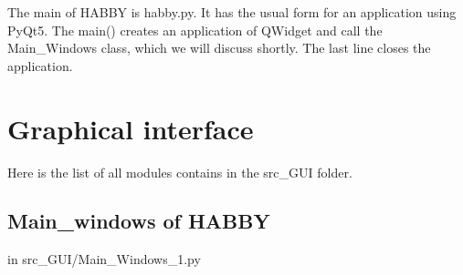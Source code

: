 \documentclass[letterpaper,10pt,english]{sphinxmanual}
\begin{document}
The main of HABBY is habby.py. It has the usual form for an application using PyQt5.  The main() creates an application of QWidget and call the Main\_Windows class, which we will discuss shortly. The last line closes the application.


\chapter{Graphical interface}
\label{\detokenize{index:graphical-interface}}
Here is the list of all modules contains in the src\_GUI folder.


\section{Main\_windows of HABBY}
\label{\detokenize{index:main-windows-of-habby}}
in src\_GUI/Main\_Windows\_1.py
\label{\detokenize{index:module-src_GUI}}\label{\detokenize{index:module-src_GUI.Main_windows_1}}
\end{document}
